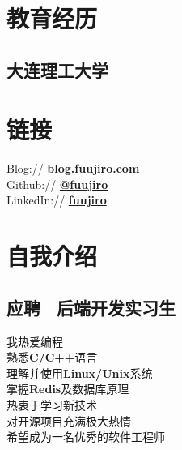 \documentclass[]{deedy-resume-openfont}
\begin{document}
%
%
\lastupdated

%
%

%
%

\begin{minipage}[t]{0.25\textwidth} 


\section{教育经历} 
\sectionsep

\subsection{大连理工大学}
\sectionsep


\section{链接}
\sectionsep
Blog://  \href{https://blog.fuujiro.com/}{\bf blog.fuujiro.com} \\  
Github:// \href{https://github.com/fuujiro}{\bf @fuujiro} \\
LinkedIn://  \href{https://www.linkedin.com/in/fuujiro}{\bf fuujiro} \\


\section{自我介绍}
\subsection{应聘 \  后端开发实习生}
我热爱编程 \\
熟悉\textbf{C/C++}语言 \\
理解并使用\textbf{Linux/Unix}系统 \\
掌握\textbf{Redis}及数据库原理 \\
热衷于学习新技术 \\
对开源项目充满极大热情 \\
希望成为一名优秀的软件工程师 \\
\sectionsep


\end{minipage}
\end{document}
